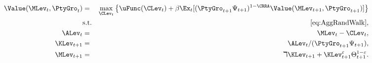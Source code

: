 \begin{eqnarray}
   \Value(\MLev_{t},\PtyGro_t) & = & \max_{\CLev_{t}} \left\{ \uFunc(\CLev_{t}) + \beta \Ex_{t}[ (\PtyGro_{t+1}\Psi_{t+1})^{1-\CRRA} \Value(\MLev_{t+1},\PtyGro_{t+1})]\right\} \nonumber  
\\   & \mbox{s.t.} & \eqref{eq:AggRandWalk}, \label{eq:DSGEscaledV}
\\   \ALev_{t} & = & \MLev_{t}-\CLev_{t}, \nonumber
\\   \KLev_{t+1} & = & \ALev_{t} / (\PtyGro_{t+1} \Psi_{t+1}), \label{eq:Ktp1DSGE}  \nonumber
\\   {\MLev}_{t+1} & = & \daleth \KLev_{t+1} + \KLev_{t+1}^{\varepsilon} \Theta_{t+1}^{1-\varepsilon}. \label{eq:Mtp1DSGE}    \nonumber
\end{eqnarray}
